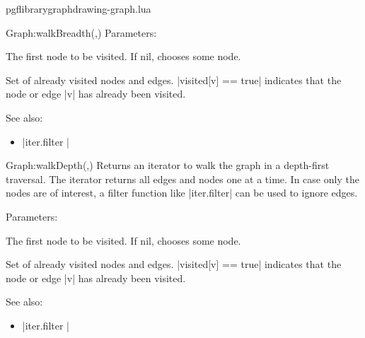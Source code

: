 \begin{filedescription}{pgflibrarygraphdrawing-graph.lua}
\begin{luacommand}{{Graph:walkBreadth}(,)}
Parameters:
\begin{parameterdescription}
	\item[\meta{root}] The first node to be visited. If nil, chooses some node.\item[\meta{visited}] Set of already visited nodes and edges. |visited[v] == true| indicates that the node or edge |v| has already been visited. 
\end{parameterdescription}



See also:
\begin{itemize}
	\item[] |iter.filter |
\end{itemize}

\end{luacommand}
\begin{luacommand}{{Graph:walkDepth}(,)}
Returns an iterator to walk the graph in a depth-first traversal.  The iterator returns all edges and nodes one at a time. In case only the nodes are of interest, a filter function like |iter.filter| can be used to ignore edges. 

Parameters:
\begin{parameterdescription}
	\item[\meta{root}] The first node to be visited. If nil, chooses some node.\item[\meta{visited}] Set of already visited nodes and edges. |visited[v] == true| indicates that the node or edge |v| has already been visited. 
\end{parameterdescription}



See also:
\begin{itemize}
	\item[] |iter.filter |
\end{itemize}

\end{luacommand}

\end{filedescription}